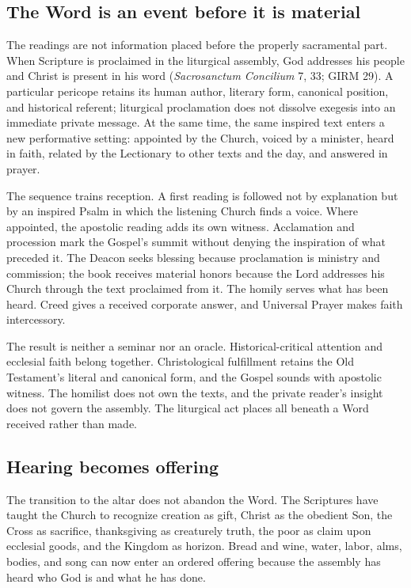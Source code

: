 \subsection{The Word is an event before it is material}

The readings are not information placed before the properly sacramental part. When Scripture is proclaimed in the liturgical assembly, God addresses his people and Christ is present in his word (\emph{Sacrosanctum Concilium} 7, 33; GIRM 29). A particular pericope retains its human author, literary form, canonical position, and historical referent; liturgical proclamation does not dissolve exegesis into an immediate private message. At the same time, the same inspired text enters a new performative setting: appointed by the Church, voiced by a minister, heard in faith, related by the Lectionary to other texts and the day, and answered in prayer.

The sequence trains reception. A first reading is followed not by explanation but by an inspired Psalm in which the listening Church finds a voice. Where appointed, the apostolic reading adds its own witness. Acclamation and procession mark the Gospel's summit without denying the inspiration of what preceded it. The Deacon seeks blessing because proclamation is ministry and commission; the book receives material honors because the Lord addresses his Church through the text proclaimed from it. The homily serves what has been heard. Creed gives a received corporate answer, and Universal Prayer makes faith intercessory.

The result is neither a seminar nor an oracle. Historical-critical attention and ecclesial faith belong together. Christological fulfillment retains the Old Testament's literal and canonical form, and the Gospel sounds with apostolic witness. The homilist does not own the texts, and the private reader's insight does not govern the assembly. The liturgical act places all beneath a Word received rather than made.

\subsection{Hearing becomes offering}

The transition to the altar does not abandon the Word. The Scriptures have taught the Church to recognize creation as gift, Christ as the obedient Son, the Cross as sacrifice, thanksgiving as creaturely truth, the poor as claim upon ecclesial goods, and the Kingdom as horizon. Bread and wine, water, labor, alms, bodies, and song can now enter an ordered offering because the assembly has heard who God is and what he has done.

